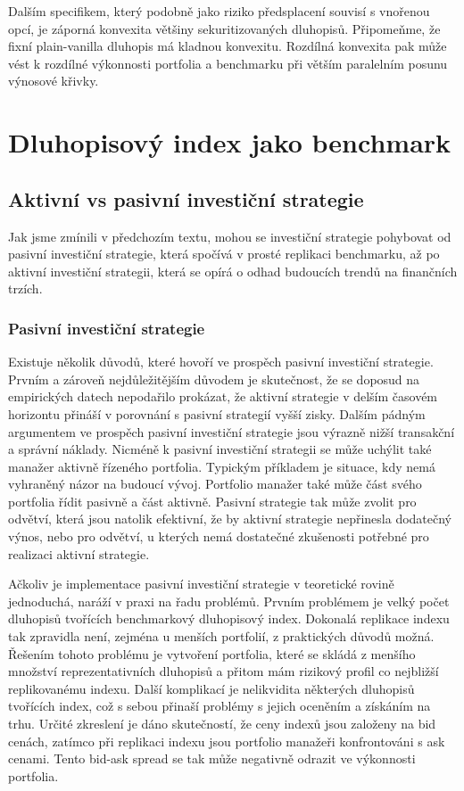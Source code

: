 \documentclass[a4paper]{book}
\begin{document}
Dalším specifikem, který podobně jako riziko předsplacení souvisí s vnořenou opcí, je záporná konvexita většiny sekuritizovaných dluhopisů. Připomeňme, že fixní plain-vanilla dluhopis má kladnou konvexitu. Rozdílná konvexita pak může vést k rozdílné výkonnosti portfolia a benchmarku při větším paralelním posunu výnosové křivky.

\section{Dluhopisový index jako benchmark}

\subsection{Aktivní vs pasivní investiční strategie}

Jak jsme zmínili v předchozím textu, mohou se investiční strategie pohybovat od pasivní investiční strategie, která spočívá v prosté replikaci benchmarku, až po aktivní investiční strategii, která se opírá o odhad budoucích trendů na finančních trzích.

\subsubsection{Pasivní investiční strategie}

Existuje několik důvodů, které hovoří ve prospěch pasivní investiční strategie. Prvním a zároveň nejdůležitějším důvodem je skutečnost, že se doposud na empirických datech nepodařilo prokázat, že aktivní strategie v delším časovém horizontu přináší v porovnání s pasivní strategií vyšší zisky. Dalším pádným argumentem ve prospěch pasivní investiční strategie jsou výrazně nižší transakční a správní náklady. Nicméně k pasivní investiční strategii se může uchýlit také manažer aktivně řízeného portfolia. Typickým příkladem je situace, kdy nemá vyhraněný názor na budoucí vývoj. Portfolio manažer také může část svého portfolia řídit pasivně a část aktivně. Pasivní strategie tak může zvolit pro odvětví, která jsou natolik efektivní, že by aktivní strategie nepřinesla dodatečný výnos, nebo pro odvětví, u kterých nemá dostatečné zkušenosti potřebné pro realizaci aktivní strategie.

Ačkoliv je implementace pasivní investiční strategie v teoretické rovině jednoduchá, naráží v praxi na řadu problémů. Prvním problémem je velký počet dluhopisů tvořících benchmarkový dluhopisový index. Dokonalá replikace indexu tak zpravidla není, zejména u menších portfolií, z praktických důvodů možná. Řešením tohoto problému je vytvoření portfolia, které se skládá z menšího množství reprezentativních dluhopisů a přitom mám rizikový profil co nejbližší replikovanému indexu. Další komplikací je nelikvidita některých dluhopisů tvořících index, což s sebou přinaší problémy s jejich oceněním a získáním na trhu. Určité zkreslení je  dáno skutečností, že ceny indexů jsou založeny na bid cenách, zatímco při replikaci indexu jsou portfolio manažeři konfrontováni s ask cenami. Tento bid-ask spread se tak může negativně odrazit ve výkonnosti portfolia.
\end{document}
